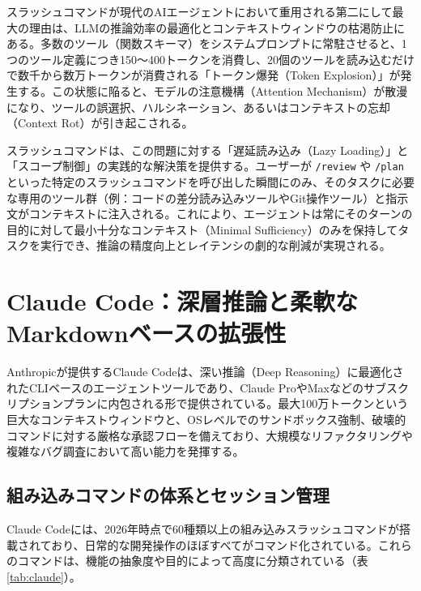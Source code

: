 \documentclass[a4paper,11pt]{ltjsarticle}
\newcommand{\cmd}[1]{\texttt{#1}}
\begin{document}
スラッシュコマンドが現代のAIエージェントにおいて重用される第二にして最大の理由は、LLMの推論効率の最適化とコンテキストウィンドウの枯渇防止にある。多数のツール（関数スキーマ）をシステムプロンプトに常駐させると、1つのツール定義につき150〜400トークンを消費し、20個のツールを読み込むだけで数千から数万トークンが消費される「トークン爆発（Token Explosion）」が発生する\cite{r15}。この状態に陥ると、モデルの注意機構（Attention Mechanism）が散漫になり、ツールの誤選択、ハルシネーション、あるいはコンテキストの忘却（Context Rot）が引き起こされる\cite{r15}。

スラッシュコマンドは、この問題に対する「遅延読み込み（Lazy Loading）」と「スコープ制御」の実践的な解決策を提供する\cite{r15}。ユーザーが \cmd{/review} や \cmd{/plan} といった特定のスラッシュコマンドを呼び出した瞬間にのみ、そのタスクに必要な専用のツール群（例：コードの差分読み込みツールやGit操作ツール）と指示文がコンテキストに注入される。これにより、エージェントは常にそのターンの目的に対して最小十分なコンテキスト（Minimal Sufficiency）のみを保持してタスクを実行でき、推論の精度向上とレイテンシの劇的な削減が実現される\cite{r15}。

\section{Claude Code：深層推論と柔軟なMarkdownベースの拡張性}

Anthropicが提供するClaude Codeは、深い推論（Deep Reasoning）に最適化されたCLIベースのエージェントツールであり、Claude ProやMaxなどのサブスクリプションプランに内包される形で提供されている\cite{r18}。最大100万トークンという巨大なコンテキストウィンドウと、OSレベルでのサンドボックス強制、破壊的コマンドに対する厳格な承認フローを備えており、大規模なリファクタリングや複雑なバグ調査において高い能力を発揮する\cite{r18}。

\subsection{組み込みコマンドの体系とセッション管理}

Claude Codeには、2026年時点で60種類以上の組み込みスラッシュコマンドが搭載されており、日常的な開発操作のほぼすべてがコマンド化されている\cite{r9}。これらのコマンドは、機能の抽象度や目的によって高度に分類されている（表\ref{tab:claude}）。
\end{document}
